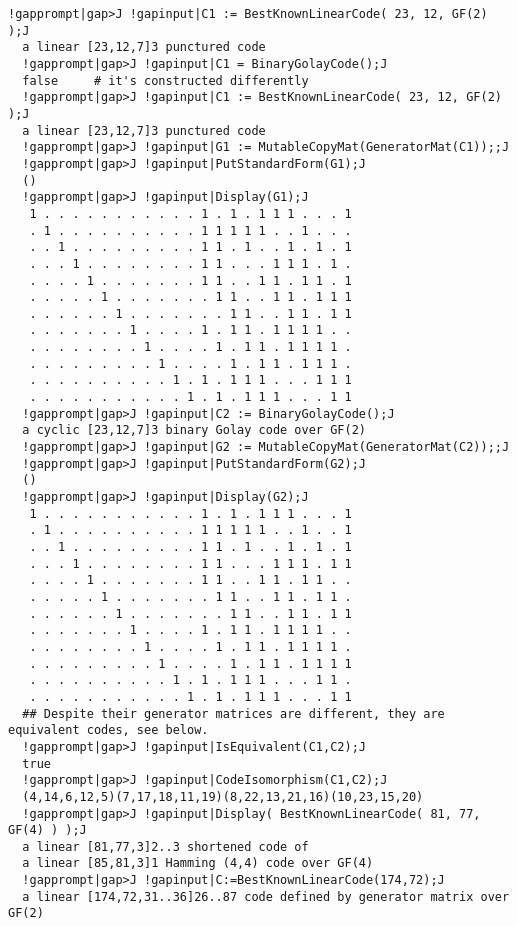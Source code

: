 \documentclass[a4paper,11pt]{report}
\begin{document}
{{ 
\begin{Verbatim}[commandchars=!|J,fontsize=\small,frame=single,label=Example]
  !gapprompt|gap>J !gapinput|C1 := BestKnownLinearCode( 23, 12, GF(2) );J
  a linear [23,12,7]3 punctured code
  !gapprompt|gap>J !gapinput|C1 = BinaryGolayCode();J
  false     # it's constructed differently
  !gapprompt|gap>J !gapinput|C1 := BestKnownLinearCode( 23, 12, GF(2) );J
  a linear [23,12,7]3 punctured code
  !gapprompt|gap>J !gapinput|G1 := MutableCopyMat(GeneratorMat(C1));;J
  !gapprompt|gap>J !gapinput|PutStandardForm(G1);J
  ()
  !gapprompt|gap>J !gapinput|Display(G1);J
   1 . . . . . . . . . . . 1 . 1 . 1 1 1 . . . 1
   . 1 . . . . . . . . . . 1 1 1 1 1 . . 1 . . .
   . . 1 . . . . . . . . . 1 1 . 1 . . 1 . 1 . 1
   . . . 1 . . . . . . . . 1 1 . . . 1 1 1 . 1 .
   . . . . 1 . . . . . . . 1 1 . . 1 1 . 1 1 . 1
   . . . . . 1 . . . . . . . 1 1 . . 1 1 . 1 1 1
   . . . . . . 1 . . . . . . . 1 1 . . 1 1 . 1 1
   . . . . . . . 1 . . . . 1 . 1 1 . 1 1 1 1 . .
   . . . . . . . . 1 . . . . 1 . 1 1 . 1 1 1 1 .
   . . . . . . . . . 1 . . . . 1 . 1 1 . 1 1 1 .
   . . . . . . . . . . 1 . 1 . 1 1 1 . . . 1 1 1
   . . . . . . . . . . . 1 . 1 . 1 1 1 . . . 1 1
  !gapprompt|gap>J !gapinput|C2 := BinaryGolayCode();J
  a cyclic [23,12,7]3 binary Golay code over GF(2)
  !gapprompt|gap>J !gapinput|G2 := MutableCopyMat(GeneratorMat(C2));;J
  !gapprompt|gap>J !gapinput|PutStandardForm(G2);J
  ()
  !gapprompt|gap>J !gapinput|Display(G2);J
   1 . . . . . . . . . . . 1 . 1 . 1 1 1 . . . 1
   . 1 . . . . . . . . . . 1 1 1 1 1 . . 1 . . 1
   . . 1 . . . . . . . . . 1 1 . 1 . . 1 . 1 . 1
   . . . 1 . . . . . . . . 1 1 . . . 1 1 1 . 1 1
   . . . . 1 . . . . . . . 1 1 . . 1 1 . 1 1 . .
   . . . . . 1 . . . . . . . 1 1 . . 1 1 . 1 1 .
   . . . . . . 1 . . . . . . . 1 1 . . 1 1 . 1 1
   . . . . . . . 1 . . . . 1 . 1 1 . 1 1 1 1 . .
   . . . . . . . . 1 . . . . 1 . 1 1 . 1 1 1 1 .
   . . . . . . . . . 1 . . . . 1 . 1 1 . 1 1 1 1
   . . . . . . . . . . 1 . 1 . 1 1 1 . . . 1 1 .
   . . . . . . . . . . . 1 . 1 . 1 1 1 . . . 1 1
  ## Despite their generator matrices are different, they are equivalent codes, see below.
  !gapprompt|gap>J !gapinput|IsEquivalent(C1,C2);J
  true
  !gapprompt|gap>J !gapinput|CodeIsomorphism(C1,C2);J
  (4,14,6,12,5)(7,17,18,11,19)(8,22,13,21,16)(10,23,15,20)
  !gapprompt|gap>J !gapinput|Display( BestKnownLinearCode( 81, 77, GF(4) ) );J
  a linear [81,77,3]2..3 shortened code of
  a linear [85,81,3]1 Hamming (4,4) code over GF(4)
  !gapprompt|gap>J !gapinput|C:=BestKnownLinearCode(174,72);J
  a linear [174,72,31..36]26..87 code defined by generator matrix over GF(2)

\end{Verbatim}}}
\end{document}
